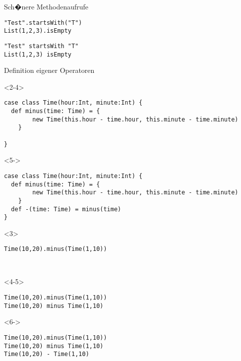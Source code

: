 \documentclass[14pt,aspectratio=169,trans]{beamer} %
\begin{document}
\begin{frame}[fragile]{}
 \begin{block}{Sch�nere Methodenaufrufe}
\scriptsize
	\onslide<2->
  \begin{lstlisting}
"Test".startsWith("T")
List(1,2,3).isEmpty
	\end{lstlisting}
  \begin{lstlisting}
"Test" startsWith "T"
List(1,2,3) isEmpty
	\end{lstlisting}
\end{block}
\note{}
\end{frame}


\begin{frame}[fragile]{}
 \begin{block}{Definition eigener Operatoren}
\scriptsize
\begin{overlayarea}{\textwidth}{4cm}
	\begin{onlyenv}<2-4>
  \begin{lstlisting}
case class Time(hour:Int, minute:Int) {
  def minus(time: Time) = {
		new Time(this.hour - time.hour, this.minute - time.minute)
	}
	
}
	\end{lstlisting}
	\end{onlyenv}
	\begin{onlyenv}<5->
	\begin{lstlisting}
case class Time(hour:Int, minute:Int) {
  def minus(time: Time) = {
		new Time(this.hour - time.hour, this.minute - time.minute)
	}
  def -(time: Time) = minus(time)
}
	\end{lstlisting}
	\end{onlyenv}
	\begin{onlyenv}
  \begin{lstlisting}[firstnumber=7]
Time(10,20).minus(Time(1,10))

			
	\end{lstlisting}
	\end{onlyenv}
	\begin{onlyenv}<4-5>
  \begin{lstlisting}[firstnumber=7]
Time(10,20).minus(Time(1,10))
Time(10,20) minus Time(1,10)

	\end{lstlisting}
	\end{onlyenv}
	\begin{onlyenv}<6->
  \begin{lstlisting}[firstnumber=7]
Time(10,20).minus(Time(1,10))
Time(10,20) minus Time(1,10)
Time(10,20) - Time(1,10)
	\end{lstlisting}
	\end{onlyenv}
	\end{overlayarea}
\end{block}
\note{}
\end{frame}
\end{document}
